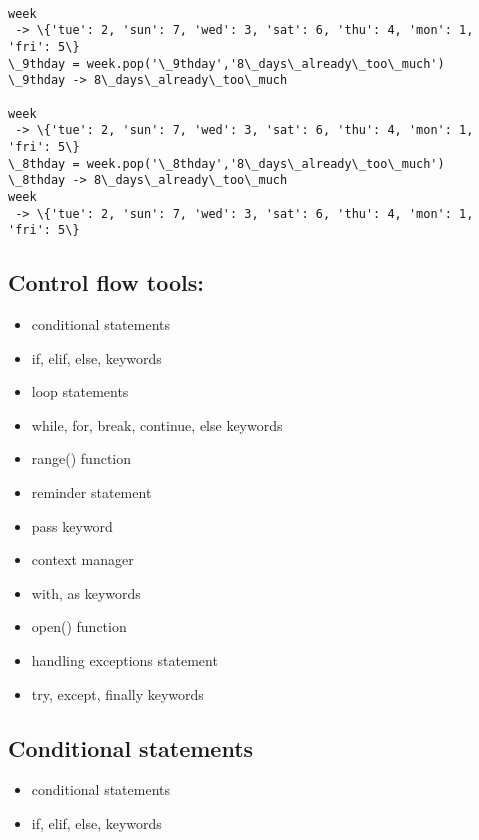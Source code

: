 \documentclass[11pt]{article}
\providecommand{\tightlist}{%
      \setlength{\itemsep}{0pt}\setlength{\parskip}{0pt}}
\begin{document}
    \begin{Verbatim}[commandchars=\\\{\}]

week
 -> \{'tue': 2, 'sun': 7, 'wed': 3, 'sat': 6, 'thu': 4, 'mon': 1, 'fri': 5\}
\_9thday = week.pop('\_9thday','8\_days\_already\_too\_much')
\_9thday -> 8\_days\_already\_too\_much

week
 -> \{'tue': 2, 'sun': 7, 'wed': 3, 'sat': 6, 'thu': 4, 'mon': 1, 'fri': 5\}
\_8thday = week.pop('\_8thday','8\_days\_already\_too\_much')
\_8thday -> 8\_days\_already\_too\_much
week
 -> \{'tue': 2, 'sun': 7, 'wed': 3, 'sat': 6, 'thu': 4, 'mon': 1, 'fri': 5\}
    \end{Verbatim}

    \hypertarget{control-flow-tools}{%
\subsection{Control flow tools:}\label{control-flow-tools}}

\begin{itemize}
\tightlist
\item
  conditional statements
\item
  if, elif, else, keywords
\item
  loop statements
\item
  while, for, break, continue, else keywords
\item
  range() function
\item
  reminder statement
\item
  pass keyword
\item
  context manager
\item
  with, as keywords
\item
  open() function
\item
  handling exceptions statement
\item
  try, except, finally keywords
\end{itemize}

    \hypertarget{conditional-statements}{%
\subsection{Conditional statements}\label{conditional-statements}}

\begin{itemize}
\tightlist
\item
  conditional statements
\item
  if, elif, else, keywords
\end{itemize}
\end{document}
